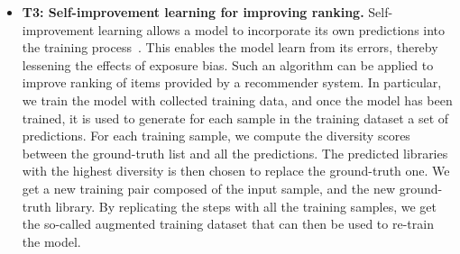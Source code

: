 \begin{itemize}
	\item \textbf{T3: Self-improvement learning for improving ranking.} %
	Self-improvement learning allows a model to incorporate its own predictions into the training process~\cite{wang2020exposure}. This enables the model learn from its errors, thereby lessening the effects of exposure bias. Such an algorithm can be applied to improve ranking of items provided by a recommender system. In particular, we train the model with collected training data, and once the model has been trained, it is used to generate for each sample in the training dataset a set of predictions. For each training sample, we compute the diversity scores between the ground-truth list and all the predictions. The predicted libraries with the highest diversity is then chosen to replace the ground-truth one. We get a new training pair composed of the input sample, and the new ground-truth library. By replicating the steps with all the training samples, we get the so-called augmented training dataset that can then be used to re-train the model.

\end{itemize}
\vspace{-.4cm}





